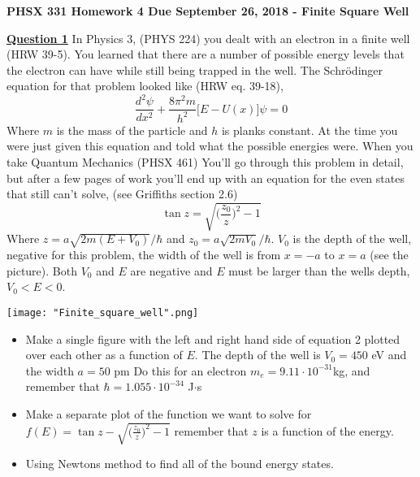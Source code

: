 \documentclass[]{letter}
\begin{document}
 
\textbf{\Large{PHSX 331 Homework 4 Due September 26, 2018 - Finite Square Well}}
 
\hrulefill
 
\textbf{\underline{Question 1}} In Physics 3, (PHYS 224) you dealt with an electron in a finite well (HRW 39-5). You learned that there are a number of possible energy levels that the electron can have while still being trapped in the well. The Schrödinger equation for that problem looked like (HRW eq. 39-18),
\begin{equation}
	\frac{d^2\psi}{dx^2} + \frac{8\pi^2m}{h^2} \big[E - U(x)\big] \psi = 0
\end{equation}
Where $m$ is the mass of the particle and $h$ is planks constant. At the time you were just given this equation and told what the possible energies were. When you take Quantum Mechanics (PHSX 461) You'll go through this problem in detail, but after a few pages of work you'll end up with an equation for the even states that still can't solve, (see Griffiths section 2.6)
\begin{equation}
	\tan z = \sqrt{\bigg(\frac{z_0}{z}\bigg)^2 - 1}
\end{equation}
Where $z = a\sqrt{2m(E + V_0)}/\hbar$ and $z_0 = a\sqrt{2mV_0}/ \hbar$. $V_0$ is the depth of the well, negative for this problem, the width of the well is from $x = -a$ to $x = a$ (see the picture). Both $V_0$ and $E$ are negative and $E$ must be larger than the wells depth,  $V_0 < E < 0$.
\begin{center}
	\texttt{[image: "Finite\_square\_well".png]}
\end{center}
\begin{itemize}
	\item Make a single figure with the left and right hand side of equation 2 plotted over each other as a function of $E$. The depth of the well is $V_0 = 450$ eV and the width $a = 50$ pm Do this for an electron $m_e = 9.11 \cdot 10^{-31}$kg, and remember that $\hbar = 1.055 \cdot 10^{-34}$ J$\cdot$s
	\item Make a separate plot of the function we want to solve for $f(E) = \tan z - \sqrt{\big(\frac{z_0}{z}\big)^2 - 1}$ remember that $z$ is a function of the energy.
	\item Using Newtons method to find all of the bound energy states. 
\end{itemize}
\end{document}
